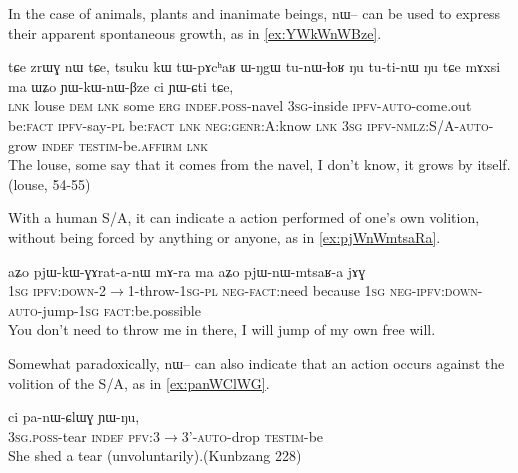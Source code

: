 \documentclass[oldfontcommands,oneside,a4paper,11pt]{article}
\newcommand{\ipa}[1]{{\phon \mbox{#1}}} %
\begin{document}
In the case of animals, plants and inanimate beings, \ipa{nɯ--} can be used to express  their apparent spontaneous growth, as in \ref{ex:YWkWnWBze}.
\begin{exe}
\ex \label{ex:YWkWnWBze}
\gll 
\ipa{tɕe} 	\ipa{zrɯɣ} 	\ipa{nɯ} 	\ipa{tɕe,} 	\ipa{tsuku} 	\ipa{kɯ} 	\ipa{tɯ-pɤcʰaʁ} 	\ipa{ɯ-ŋgɯ} 	\ipa{tu-nɯ-ɬoʁ} 	\ipa{ŋu} 	\ipa{tu-ti-nɯ} 	\ipa{ŋu} 	\ipa{tɕe} 	\ipa{mɤxsi} 	\ipa{ma} 	\ipa{ɯʑo} 	\ipa{ɲɯ-kɯ-nɯ-βze} 	\ipa{ci} 	\ipa{ɲɯ-ɕti} 	\ipa{tɕe,} 	\\
\textsc{lnk} louse \textsc{dem} \textsc{lnk} some \textsc{erg} \textsc{indef.poss}-navel \textsc{3sg}-inside \textsc{ipfv-auto}-come.out be:\textsc{fact} \textsc{ipfv}-say-\textsc{pl}  be:\textsc{fact} \textsc{lnk} \textsc{neg:genr:}A:know \textsc{lnk} \textsc{3sg} \textsc{ipfv-nmlz:S/A-auto}-grow \textsc{indef} \textsc{testim}-be.\textsc{affirm} \textsc{lnk} \\
\glt The louse, some say that it comes from the navel, I don't know, it grows by itself. (louse, 54-55)
\end{exe}

With a human S/A, it can indicate a action performed of one's own volition, without being forced by anything or anyone, as in \ref{ex:pjWnWmtsaRa}.

\begin{exe}
\ex
\gll \label{ex:pjWnWmtsaRa}
\ipa{aʑo} 	\ipa{pjɯ-kɯ-ɣɤrat-a-nɯ} 	\ipa{mɤ-ra} 	\ipa{ma} 	\ipa{aʑo} 	\ipa{pjɯ-nɯ-mtsaʁ-a} 	\ipa{jɤɣ} \\
\textsc{1sg} \textsc{ipfv:down}-2$\rightarrow$1-throw-\textsc{1sg-pl} \textsc{neg-fact}:need because \textsc{1sg} \textsc{neg-ipfv:down-auto}-jump-\textsc{1sg} \textsc{fact}:be.possible \\
\glt You don't need to throw me in there, I will jump of my own free will.
\end{exe}

Somewhat paradoxically, \ipa{nɯ--} can also indicate that an action occurs against the volition of the S/A, as in \ref{ex:panWClWG}. 

\begin{exe}
\ex \label{ex:panWClWG}
\gll \ipa{ɯ-qom} 	\ipa{ci} 	\ipa{pa-nɯ-ɕlɯɣ} 	\ipa{ɲɯ-ŋu,} \\
\textsc{3sg.poss}-tear \textsc{indef} \textsc{pfv:3$\rightarrow$3'-auto}-drop \textsc{testim}-be \\
\glt She shed a tear (unvoluntarily).(Kunbzang 228)
\end{exe}
\end{document}
